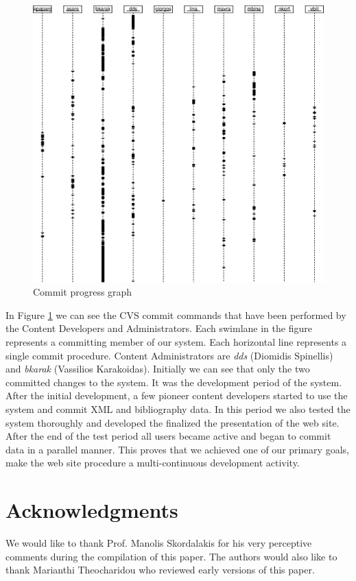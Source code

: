 \documentclass[10pt]{article}
\begin{document}
\begin{figure}[h!]
\includegraphics[scale=0.6]{cvs-log.eps}
\caption{Commit progress graph}
\label{fig:cvs-log}
\end{figure}

In Figure \ref{fig:cvs-log} we can see the {\sc CVS} commit commands that have been performed by
the Content Developers and Administrators. Each swimlane in the figure represents a committing
member of our system. Each horizontal line represents a single commit procedure. Content Administrators
are \textit{dds} (Diomidis Spinellis) and \textit{bkarak} (Vassilios Karakoidas). Initially we can see that only the two committed 
changes to the system. It was the development period of the system. After the initial development, a few 
pioneer content developers started to use the system and commit {\sc XML} and bibliography data. In this period 
we also tested the system thoroughly and developed the finalized the presentation of the web site. After the end of
the test period all users became active and began to commit data in a parallel manner. This proves that we achieved 
one of our primary goals, make the web site procedure a multi-continuous development activity.

\section{Acknowledgments}
\label{sec:ack}

We would like to thank Prof. Manolis Skordalakis for his very perceptive comments during the compilation of this paper.
The authors would also like to thank Marianthi Theocharidou who reviewed early versions 
of this paper.



\end{document}
